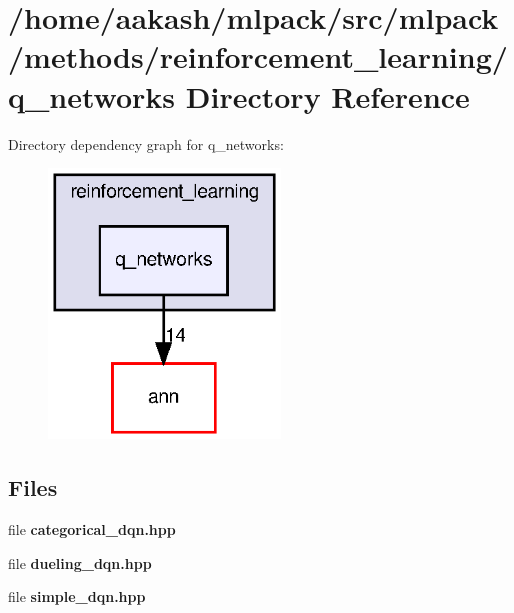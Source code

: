 \section{/home/aakash/mlpack/src/mlpack/methods/reinforcement\+\_\+learning/q\+\_\+networks Directory Reference}
\label{dir_3eca95ca89dfa16a6232373b37627c02}
Directory dependency graph for q\+\_\+networks\+:
\nopagebreak
\begin{figure}[H]
\begin{center}
\leavevmode
\includegraphics[width=175pt]{dir_3eca95ca89dfa16a6232373b37627c02_dep}
\end{center}
\end{figure}
\subsection*{Files}
\begin{DoxyCompactItemize}
\item 
file \textbf{ categorical\+\_\+dqn.\+hpp}
\item 
file \textbf{ dueling\+\_\+dqn.\+hpp}
\item 
file \textbf{ simple\+\_\+dqn.\+hpp}
\end{DoxyCompactItemize}

